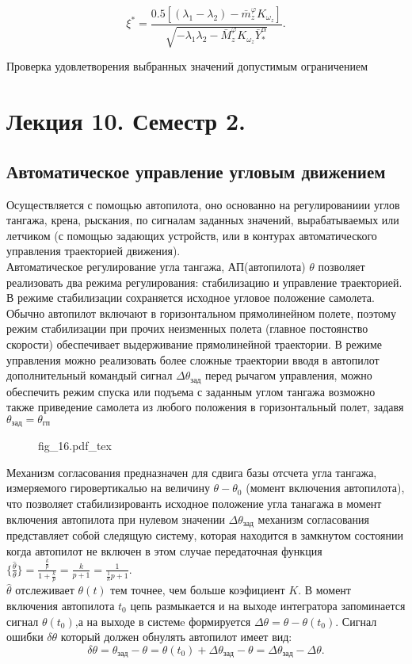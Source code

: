 \documentclass{article}
\begin{document}
\[
\xi^* = \frac{0.5[(\lambda_1 - \lambda_2) - \bar{m}_z^\varphi K_{\omega_z}]}{\sqrt{-\lambda_1\lambda_2 - \bar{M}_z^\varphi K_{\omega_z}\bar{Y}_*^\alpha }}.
\]

Проверка удовлетворения выбранных значений допустимым ограничением

\section{Лекция 10. Семестр 2.}
\subsection{Автоматическое управление угловым движением}
Осуществляется с помощью автопилота, оно основанно на регулированиии углов тангажа, крена, рыскания, по сигналам заданных значений, вырабатываемых или летчиком (с помощью задающих устройств, или в контурах автоматического управления траекторией движения).\\ 
Автоматическое регулирование угла тангажа, АП(автопилота) $\theta$ позволяет реализовать два режима регулирования: стабилизацию и управление траекторией.\\ 
В режиме стабилизации сохраняется исходное угловое положение самолета. Обычно автопилот включают в горизонтальном прямолинейном полете, поэтому режим стабилизации при прочих неизменных полета (главное постоянство скорости) обеспечивает выдерживание прямолинейной траектории. В режиме управления можно реализовать более сложные траектории вводя в автопилот дополнительный командый сигнал $\Delta \theta_{зад}$ перед рычагом управления, можно обеспечить режим спуска или подъема с заданным углом тангажа возможно также приведение самолета из любого положения в горизонтальный полет, задавя $\theta_{зад} = \theta_{гп}$ 

\begin{figure}[ht]
\centering
{fig_16.pdf_tex}
\end{figure}

Механизм согласования предназначен для сдвига базы отсчета угла тангажа, измеряемого гировертикалью на величину $\theta - \theta_0$ (момент включения автопилота), что позволяет стабилизированть исходное положение угла танагажа в момент включения автопилота при нулевом значении $\Delta \theta_{зад}$ механизм согласования представляет собой следящую систему, которая находится в замкнутом состоянии когда автопилот не включен в этом случае передаточная функция $\{{\frac{\hat{\theta}}{\theta}}\}= \frac{\frac{k}{p}}{1 + \frac{k}{p}} =\frac{k}{p+1}=\frac{1}{\frac{1}{k}p + 1}$.\\
$\hat{\theta}$ отслеживает $\theta(t)$ тем точнее, чем больше коэфициент $K$. В момент включения автопилота $t_0$ цепь размыкается и на выходе интегратора запоминается сигнал $\theta(t_0)$,а на выходе в системe формируется $\Delta \theta = \theta - \theta(t_0)$. Сигнал ошибки $\delta \theta $ который должен обнулять автопилот имеет вид:
\[
\delta \theta = \theta_{зад} - \theta = \theta(t_0) + \Delta \theta_{зад} - \theta = \Delta \theta_{зад} - \Delta \theta.
\]
\end{document}
